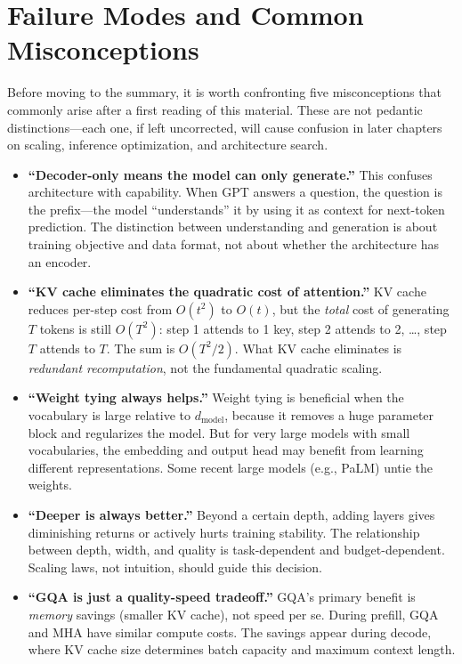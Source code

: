 \section{Failure Modes and Common Misconceptions}

Before moving to the summary, it is worth confronting five misconceptions that commonly arise after a first reading of this material. These are not pedantic distinctions---each one, if left uncorrected, will cause confusion in later chapters on scaling, inference optimization, and architecture search.

\begin{itemize}
  \item \textbf{``Decoder-only means the model can only generate.''} This confuses architecture with capability. When GPT answers a question, the question is the prefix---the model ``understands'' it by using it as context for next-token prediction. The distinction between understanding and generation is about training objective and data format, not about whether the architecture has an encoder.

  \item \textbf{``KV cache eliminates the quadratic cost of attention.''} KV cache reduces per-step cost from $O(t^2)$ to $O(t)$, but the \emph{total} cost of generating $T$ tokens is still $O(T^2)$: step 1 attends to 1 key, step 2 attends to 2, \ldots, step $T$ attends to $T$. The sum is $O(T^2/2)$. What KV cache eliminates is \emph{redundant recomputation}, not the fundamental quadratic scaling.

  \item \textbf{``Weight tying always helps.''} Weight tying is beneficial when the vocabulary is large relative to $d_{\text{model}}$, because it removes a huge parameter block and regularizes the model. But for very large models with small vocabularies, the embedding and output head may benefit from learning different representations. Some recent large models (e.g., PaLM) untie the weights.

  \item \textbf{``Deeper is always better.''} Beyond a certain depth, adding layers gives diminishing returns or actively hurts training stability. The relationship between depth, width, and quality is task-dependent and budget-dependent. Scaling laws, not intuition, should guide this decision.

  \item \textbf{``GQA is just a quality-speed tradeoff.''} GQA's primary benefit is \emph{memory} savings (smaller KV cache), not speed per se. During prefill, GQA and MHA have similar compute costs. The savings appear during decode, where KV cache size determines batch capacity and maximum context length.
\end{itemize}


